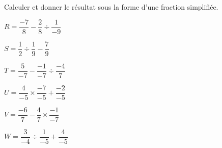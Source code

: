 \begin{exercice*}
    Calculer et donner le résultat sous la forme d'une fraction simplifiée.
        \begin{list}{}{}
            \begin{spacing}{2}
                \item $R = \dfrac{-7}{8} - \dfrac{2}{8}  \div  \dfrac{1}{-9}$
                \item $S = \dfrac{1}{2}  \div  \dfrac{1}{9} - \dfrac{7}{9}$
                \item $T = \dfrac{5}{-7} - \dfrac{-1}{-7}  \div  \dfrac{-4}{7}$
                \item $U = \dfrac{4}{-5}  \times  \dfrac{-7}{-5} + \dfrac{-2}{-5}$
                \item $V = \dfrac{-6}{7} - \dfrac{4}{7}  \times  \dfrac{-1}{-7}$
                \item $W = \dfrac{3}{-4}  \div  \dfrac{1}{-5} + \dfrac{4}{-5}$
            \end{spacing}
        \end{list}


\end{exercice*}
